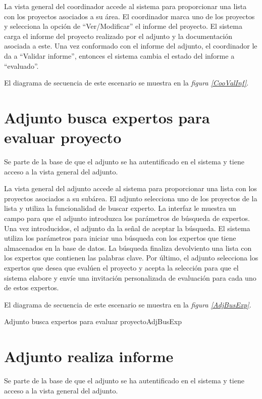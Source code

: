 \documentclass[11pt,a4paper,spanish,twoside]{book}
\begin{document}
La vista general del coordinador accede al sistema para proporcionar una
lista con los proyectos asociados a su área. El coordinador marca uno
de los proyectos y selecciona la opción de ``Ver/Modificar'' el informe del
proyecto. El sistema carga el informe del proyecto realizado por el adjunto
y la documentación asociada a este. Una vez conformado con el informe del
adjunto, el coordinador le da a ``Validar informe'', entonces el sistema
cambia el estado del informe a ``evaluado''.

El diagrama de secuencia de este escenario se muestra en la \emph{figura
\ref{CooValInf}}.


\section{Adjunto busca expertos para evaluar proyecto}
Se parte de la base de que el adjunto se ha autentificado en el sistema y
tiene acceso a la vista general del adjunto.

La vista general del adjunto accede al sistema para proporcionar una lista
con los proyectos asociados a su subárea. El adjunto selecciona uno de los
proyectos de la lista y utiliza la funcionalidad de buscar experto. La 
interfaz le muestra un campo para que el adjunto introduzca los parámetros de
búsqueda de expertos. Una vez introducidos, el adjunto da la señal de
aceptar la búsqueda. El sistema utiliza los parámetros para iniciar una 
búsqueda con los expertos que tiene almacenados en la base de datos. La
búsqueda finaliza devolviento una lista con los expertos que contienen las
palabras clave. Por último, el adjunto selecciona los expertos que desea que
evalúen el proyecto y acepta la selección para que el sistema elabore y
envíe una invitación personalizada de evaluación para cada uno de estos
expertos.

El diagrama de secuencia de este escenario se muestra en la \emph{figura
\ref{AdjBusExp}}.

{Adjunto busca expertos para evaluar proyecto}{AdjBusExp}

\section{Adjunto realiza informe}
Se parte de la base de que el adjunto se ha autentificado en el sistema y
tiene acceso a la vista general del adjunto.
\end{document}
